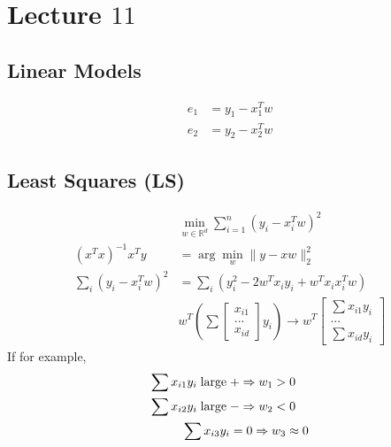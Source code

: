 \documentclass{article}
\begin{document}
\section{Lecture $11$} 


\subsection{Linear Models}
\begin{align*}
e_{1} &= y_{1} - x_{1}^{T} w 
\\ e_{2} &= y_{2} - x_{2}^{T} w 
\end{align*}


\subsection{Least Squares (LS)}
\begin{align*}
&\displaystyle\min_{w \in \mathbb{R}^{d}} \displaystyle\sum_{i=1}^{n} \left(y_{i} - x_{i}^{T} w\right)^{2}
\\ \left(x^{T} x\right)^{-1} x^{T} y &= \arg\displaystyle\min_{w} \| y - x w \|_{2}^{2}
\\ \displaystyle\sum_{i} \left(y_{i} - x_{i}^{T} w\right)^{2} &= \displaystyle\sum_{i} \left(y_{i}^{2} - 2 w^{T} x_{i} y_{i} + w^{T} x_{i} x_{i}^{T} w \right)
\\ &  w^{T} \left(\displaystyle\sum \begin{bmatrix} x_{i1} \\ ... \\ x_{id} \end{bmatrix} y_{i}\right) \to  w^{T} \begin{bmatrix} \displaystyle\sum x_{i1} y_{i} \\ ... \\ \displaystyle\sum x_{id} y_{i} \end{bmatrix}
\end{align*}
If for example,
\begin{align*}
\displaystyle\sum x_{i1} y_{i} \text{\;large\;} &  + \Rightarrow  w_{1} > 0
\\ \displaystyle\sum x_{i2} y_{i} \text{\;large\;} &  - \Rightarrow  w_{2} < 0
\\ \displaystyle\sum x_{i3} y_{i} &= 0 \Rightarrow  w_{3} \approx 0
\end{align*}
\end{document}
